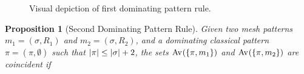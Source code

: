 \documentclass[11pt,a4paper]{article}
\newtheorem{proposition}[theorem]{Proposition}
\begin{document}
\begin{figure}[hbt]
    \begin{center}
        \raisebox{2ex}{\(\mapsto\)}

        \caption{Visual depiction of first dominating pattern rule.}
        \label{fig:rule1}
    \end{center}
\end{figure}

\begin{proposition}[Second Dominating Pattern Rule]
    \label{prop:dom2}
    Given two mesh patterns \(m_1 =(\sigma, R_1)\) and \(m_2 = (\sigma, R_2)\),
    and a dominating classical pattern \(\pi = (\pi,\emptyset)\) such that
    \(\left|\pi\right| \le \left|\sigma\right| + 2\), the sets \(\operatorname{Av}_{}\!\left(\{\pi,m_1\}\right)\) and
    \(\operatorname{Av}_{}\!\left(\{\pi,m_2\}\right)\) are coincident if


\end{proposition}
\end{document}
